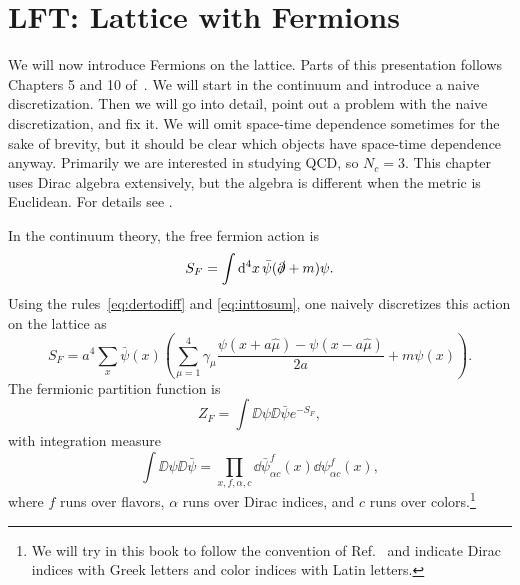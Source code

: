 \chapter{LFT: Lattice with Fermions}\label{ch:ferm}

We will now introduce Fermions on the lattice. Parts of this presentation 
follows Chapters 5 and 10 of~\cite{gattringer_quantum_2010}. 
We will start in the continuum
and introduce a naive discretization. Then we will go into detail, point
out a problem with the naive discretization, and fix it. We will omit
space-time dependence sometimes for the sake of brevity, but it should
be clear which objects have space-time dependence anyway. Primarily
we are interested in studying QCD, so $N_c=3$. This chapter uses Dirac
algebra extensively, but the algebra is different when the metric
is Euclidean. For details see .

In the continuum theory, the free fermion action is 
\begin{equation}
  S_F=\int\dd[4]{x}\bar{\psi}(\slashed{\partial}+m)\psi.
\end{equation}
Using the rules~\eqref{eq:dertodiff} and \eqref{eq:inttosum}, one naively
discretizes this action on the lattice as
\begin{equation}\label{eq:naivefermact}
  S_F=a^4\sum_x\bar{\psi}(x)\left(\sum_{\mu=1}^4\gamma_\mu
       \frac{\psi(x+a\hat{\mu})-\psi(x-a\hat{\mu})}{2a}
       +m\psi(x)\right).
\end{equation}
The fermionic partition function is
\begin{equation}
  Z_F=\int\DD{\psi}\DD{\bar{\psi}}e^{-S_F},
\end{equation}
with integration measure
\begin{equation}\label{eq:fermionIntegrationMeasure}
  \int\DD{\psi}\DD{\bar{\psi}}
   =\prod_{x,f,\alpha,c}\dd{\bar{\psi}^f_{\alpha c}(x)}
                        \dd{\psi^f_{\alpha c}(x)},
\end{equation}
where $f$ runs over flavors, $\alpha$ runs over Dirac indices, and $c$
runs over colors.\footnote{We will try in this book to follow the convention of
Ref.~\cite{gattringer_quantum_2010} and indicate Dirac indices with Greek
letters and color indices with Latin letters.}

